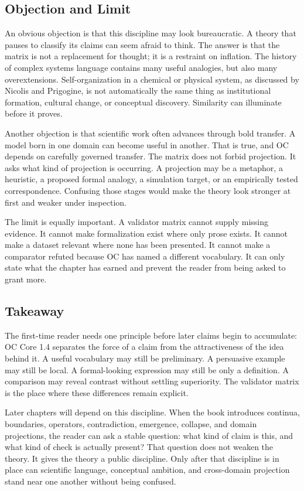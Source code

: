 \documentclass[11pt,a4paper,openany]{book}
\begin{document}
\subsection{Objection and Limit}
An obvious objection is that this discipline may look bureaucratic. A theory that pauses to classify its claims can seem afraid to think. The answer is that the matrix is not a replacement for thought; it is a restraint on inflation. The history of complex systems language contains many useful analogies, but also many overextensions. Self-organization in a chemical or physical system, as discussed by Nicolis and Prigogine, is not automatically the same thing as institutional formation, cultural change, or conceptual discovery. Similarity can illuminate before it proves. \cite{landau_stat_physics,prigogine_dissipative}\par
Another objection is that scientific work often advances through bold transfer. A model born in one domain can become useful in another. That is true, and OC depends on carefully governed transfer. The matrix does not forbid projection. It asks what kind of projection is occurring. A projection may be a metaphor, a heuristic, a proposed formal analogy, a simulation target, or an empirically tested correspondence. Confusing those stages would make the theory look stronger at first and weaker under inspection.\par
The limit is equally important. A validator matrix cannot supply missing evidence. It cannot make formalization exist where only prose exists. It cannot make a dataset relevant where none has been presented. It cannot make a comparator refuted because OC has named a different vocabulary. It can only state what the chapter has earned and prevent the reader from being asked to grant more.\par
\subsection{Takeaway}
The first-time reader needs one principle before later claims begin to accumulate: OC Core 1.4 separates the force of a claim from the attractiveness of the idea behind it. A useful vocabulary may still be preliminary. A persuasive example may still be local. A formal-looking expression may still be only a definition. A comparison may reveal contrast without settling superiority. The validator matrix is the place where these differences remain explicit. \cite{landau_stat_physics,prigogine_dissipative}\par
Later chapters will depend on this discipline. When the book introduces continua, boundaries, operators, contradiction, emergence, collapse, and domain projections, the reader can ask a stable question: what kind of claim is this, and what kind of check is actually present? That question does not weaken the theory. It gives the theory a public discipline. Only after that discipline is in place can scientific language, conceptual ambition, and cross-domain projection stand near one another without being confused.\par
\end{document}
